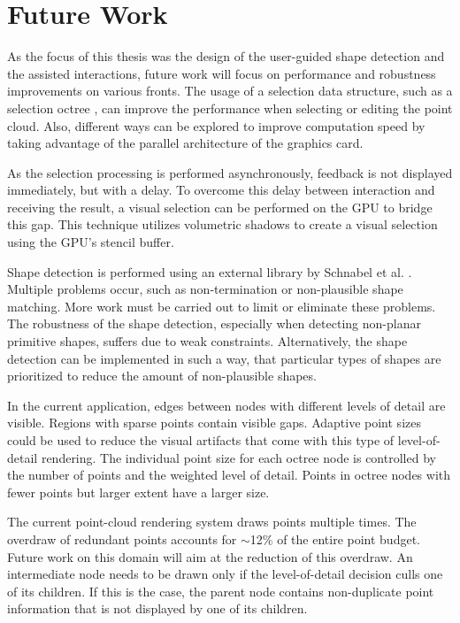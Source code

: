 \section{Future Work}

As the focus of this thesis was the design of the user-guided shape detection and the assisted interactions, future work will focus on performance and robustness improvements on various fronts. The usage of a selection data structure, such as a selection octree \cite{scheiblauer2011out}, can improve the performance when selecting or editing the point cloud. Also, different ways can be explored to improve computation speed by taking advantage of the parallel architecture of the graphics card. 

\par

As the selection processing is performed asynchronously, feedback is not displayed immediately, but with a delay. To overcome this delay between interaction and receiving the result, a visual selection can be performed on the GPU \cite{rainer2016visual} to bridge this gap. This technique utilizes volumetric shadows to create a visual selection using the GPU's stencil buffer. 

\par

Shape detection is performed using an external library by Schnabel et al. \cite{schnabel-2007-software}. Multiple problems occur, such as non-termination or non-plausible shape matching. More work must be carried out to limit or eliminate these problems. The robustness of the shape detection, especially when detecting non-planar primitive shapes, suffers due to weak constraints. Alternatively, the shape detection can be implemented in such a way, that particular types of shapes are prioritized to reduce the amount of non-plausible shapes. 

\par

In the current application, edges between nodes with different levels of detail are visible. Regions with sparse points contain visible gaps. Adaptive point sizes \cite{scheiblauer-thesis} could be used to reduce the visual artifacts that come with this type of level-of-detail rendering. The individual point size for each octree node is controlled by the number of points and the weighted level of detail. Points in octree nodes with fewer points but larger extent have a larger size. 

\par 

The current point-cloud rendering system draws points multiple times. The overdraw of redundant points accounts for $\sim$12\% of the entire point budget. Future work on this domain will aim at the reduction of this overdraw. An intermediate node needs to be drawn only if the level-of-detail decision culls one of its children. If this is the case, the parent node contains non-duplicate point information that is not displayed by one of its children.